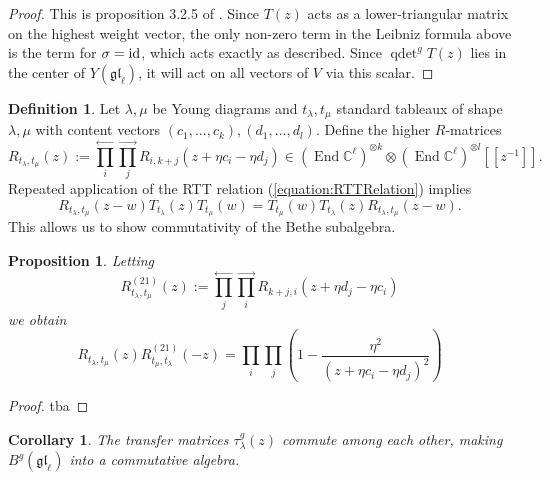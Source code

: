 \documentclass[11pt]{report}
\newtheorem{prop}[theorem]{Proposition}
\newtheorem{corollary}[theorem]{Corollary}
\theoremstyle{definition}
\newtheorem{definition}[theorem]{Definition}
\theoremstyle{remark}
\theoremstyle{remark}
\newcommand{\End}{\operatorname{End}}
\newcommand{\id}{\textnormal{id}}
\newcommand{\C}{\mathbb{C}}
\begin{document}
\begin{proof}
This is proposition 3.2.5 of \cite{book:molev}. Since $T(z)$ acts as a lower-triangular matrix on the highest weight vector, the only non-zero term in the Leibniz formula above is the term for $\sigma = \id$, which acts exactly as described. Since $\operatorname{qdet}^g T(z)$ lies in the center of $Y(\mathfrak{gl}_\ell)$, it will act on all vectors of $V$ via this scalar.
\end{proof}

\begin{definition}
Let $\lambda,\mu$ be Young diagrams and $t_\lambda,t_\mu$ standard tableaux of shape $\lambda,\mu$ with content vectors $(c_1,...,c_k),(d_1,...,d_l)$. Define the higher $R$-matrices
\begin{equation*}
R_{t_\lambda,t_\mu}(z) := \overset{\longleftarrow}{\prod_i} \overset{\longrightarrow}{\prod_j} R_{i,k+j}(z+\eta c_i - \eta d_j) \in (\End \C^\ell)^{\otimes k} \otimes (\End \C^\ell)^{\otimes l}[[z^{-1}]].
\end{equation*}
Repeated application of the RTT relation (\ref{equation:RTTRelation}) implies
\begin{equation*}
R_{t_\lambda,t_\mu}(z-w) T_{t_\lambda}(z) T_{t_\mu}(w) = T_{t_\mu}(w) T_{t_\lambda}(z) R_{t_\lambda,t_\mu}(z-w).
\end{equation*}
This allows us to show commutativity of the Bethe subalgebra.
\end{definition}

\begin{prop}
Letting
\begin{equation*}
R_{t_\lambda,t_\mu}^{(21)}(z) := \overset{\longleftarrow}{\prod_j} \overset{\longrightarrow}{\prod_i} R_{k+j,i}(z+\eta d_j - \eta c_i)
\end{equation*}
we obtain
\begin{equation*}
R_{t_\lambda,t_\mu}(z) R_{t_\mu,t_\lambda}^{(21)}(-z) = \prod_i \prod_j \left( 1 - \frac{\eta^2}{(z+\eta c_i-\eta d_j)^2}\right)
\end{equation*}
\end{prop}

\begin{proof}
tba
\end{proof}

\begin{corollary}
The transfer matrices $\tau_\lambda^g(z)$ commute among each other, making $B^g(\mathfrak{gl}_\ell)$ into a commutative algebra.
\end{corollary}
\end{document}
